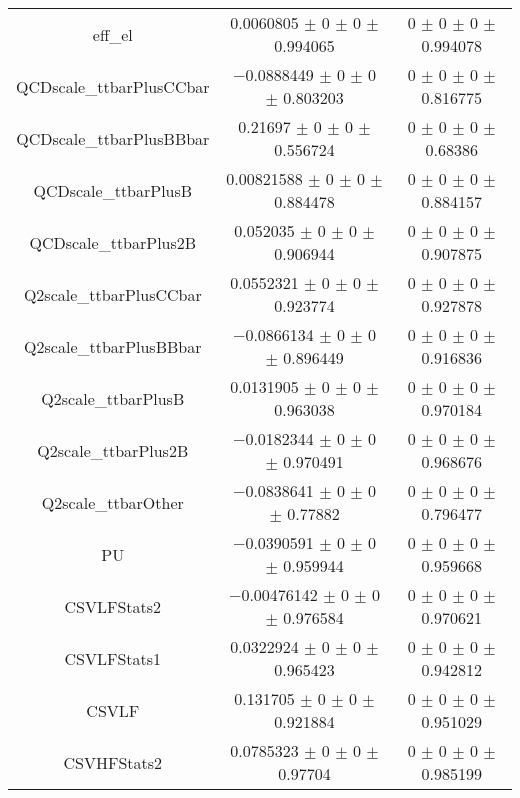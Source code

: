 \begin{table}
\begin{tabular}{ccc}
eff\_el & \num{0.0060805} $\pm$ \num{0} $\pm$ \num{0} $\pm$ \num{0.994065} & \num{0} $\pm$ \num{0} $\pm$ \num{0} $\pm$ \num{0.994078}\\
QCDscale\_ttbarPlusCCbar & \num{-0.0888449} $\pm$ \num{0} $\pm$ \num{0} $\pm$ \num{0.803203} & \num{0} $\pm$ \num{0} $\pm$ \num{0} $\pm$ \num{0.816775}\\
QCDscale\_ttbarPlusBBbar & \num{0.21697} $\pm$ \num{0} $\pm$ \num{0} $\pm$ \num{0.556724} & \num{0} $\pm$ \num{0} $\pm$ \num{0} $\pm$ \num{0.68386}\\
QCDscale\_ttbarPlusB & \num{0.00821588} $\pm$ \num{0} $\pm$ \num{0} $\pm$ \num{0.884478} & \num{0} $\pm$ \num{0} $\pm$ \num{0} $\pm$ \num{0.884157}\\
QCDscale\_ttbarPlus2B & \num{0.052035} $\pm$ \num{0} $\pm$ \num{0} $\pm$ \num{0.906944} & \num{0} $\pm$ \num{0} $\pm$ \num{0} $\pm$ \num{0.907875}\\
Q2scale\_ttbarPlusCCbar & \num{0.0552321} $\pm$ \num{0} $\pm$ \num{0} $\pm$ \num{0.923774} & \num{0} $\pm$ \num{0} $\pm$ \num{0} $\pm$ \num{0.927878}\\
Q2scale\_ttbarPlusBBbar & \num{-0.0866134} $\pm$ \num{0} $\pm$ \num{0} $\pm$ \num{0.896449} & \num{0} $\pm$ \num{0} $\pm$ \num{0} $\pm$ \num{0.916836}\\
Q2scale\_ttbarPlusB & \num{0.0131905} $\pm$ \num{0} $\pm$ \num{0} $\pm$ \num{0.963038} & \num{0} $\pm$ \num{0} $\pm$ \num{0} $\pm$ \num{0.970184}\\
Q2scale\_ttbarPlus2B & \num{-0.0182344} $\pm$ \num{0} $\pm$ \num{0} $\pm$ \num{0.970491} & \num{0} $\pm$ \num{0} $\pm$ \num{0} $\pm$ \num{0.968676}\\
Q2scale\_ttbarOther & \num{-0.0838641} $\pm$ \num{0} $\pm$ \num{0} $\pm$ \num{0.77882} & \num{0} $\pm$ \num{0} $\pm$ \num{0} $\pm$ \num{0.796477}\\
PU & \num{-0.0390591} $\pm$ \num{0} $\pm$ \num{0} $\pm$ \num{0.959944} & \num{0} $\pm$ \num{0} $\pm$ \num{0} $\pm$ \num{0.959668}\\
CSVLFStats2 & \num{-0.00476142} $\pm$ \num{0} $\pm$ \num{0} $\pm$ \num{0.976584} & \num{0} $\pm$ \num{0} $\pm$ \num{0} $\pm$ \num{0.970621}\\
CSVLFStats1 & \num{0.0322924} $\pm$ \num{0} $\pm$ \num{0} $\pm$ \num{0.965423} & \num{0} $\pm$ \num{0} $\pm$ \num{0} $\pm$ \num{0.942812}\\
CSVLF & \num{0.131705} $\pm$ \num{0} $\pm$ \num{0} $\pm$ \num{0.921884} & \num{0} $\pm$ \num{0} $\pm$ \num{0} $\pm$ \num{0.951029}\\
CSVHFStats2 & \num{0.0785323} $\pm$ \num{0} $\pm$ \num{0} $\pm$ \num{0.97704} & \num{0} $\pm$ \num{0} $\pm$ \num{0} $\pm$ \num{0.985199}\\

\end{tabular}
\end{table}
